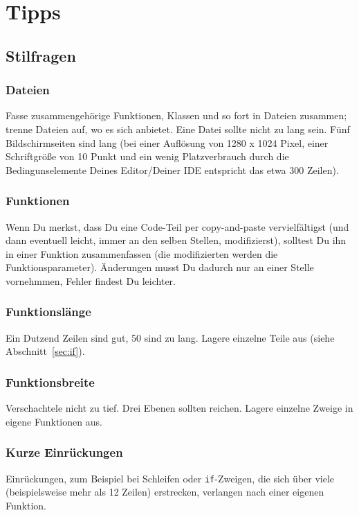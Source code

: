\documentclass[twoside]{scrartcl}
\providecommand{\code}[1]{\texttt{#1}}
\begin{document}
\section{Tipps\label{sec:tipps}}
\subsection{Stilfragen}
\subsubsection{Dateien}
Fasse zusammengeh\"o{}rige Funktionen, Klassen und so fort in Dateien zusammen; 
trenne Dateien auf, wo es sich anbietet.
Eine Datei sollte nicht zu lang sein. F\"u{}nf Bildschirmseiten sind
lang (bei einer Aufl\"o{}sung von 1280 x 1024 Pixel, einer
Schriftgr\"o{}\ss{}e von 10 Punkt und ein wenig Platzverbrauch durch die
Bedingunselemente Deines Editor/Deiner IDE entspricht das etwa 300
Zeilen).

\subsubsection{Funktionen}
Wenn Du merkst, dass Du eine Code-Teil per copy-and-paste vervielf\"a{}ltigst
(und dann eventuell leicht, immer an den selben Stellen, modifizierst),
solltest Du ihn in einer Funktion zusammenfassen (die modifizierten werden die
Funktionsparameter). 
\"A{}nderungen musst Du dadurch nur an einer Stelle vornehmmen, Fehler 
findest Du leichter.

\subsubsection{Funktionsl\"a{}nge} 
Ein Dutzend Zeilen sind gut, 50 sind zu lang.
Lagere einzelne Teile aus (siehe Abschnitt~\ref{sec:if}).

\subsubsection{Funktionsbreite\label{sec:breite}} 
Verschachtele nicht zu tief. Drei Ebenen sollten reichen. 
Lagere einzelne Zweige in eigene Funktionen aus.

\subsubsection{Kurze Einr\"u{}ckungen} 
Einr\"u{}ckungen, zum Beispiel bei Schleifen oder \code{if}-Zweigen,
die sich \"u{}ber viele (beispielsweise mehr als 12 Zeilen) erstrecken, 
verlangen nach einer eigenen Funktion.
\end{document}
